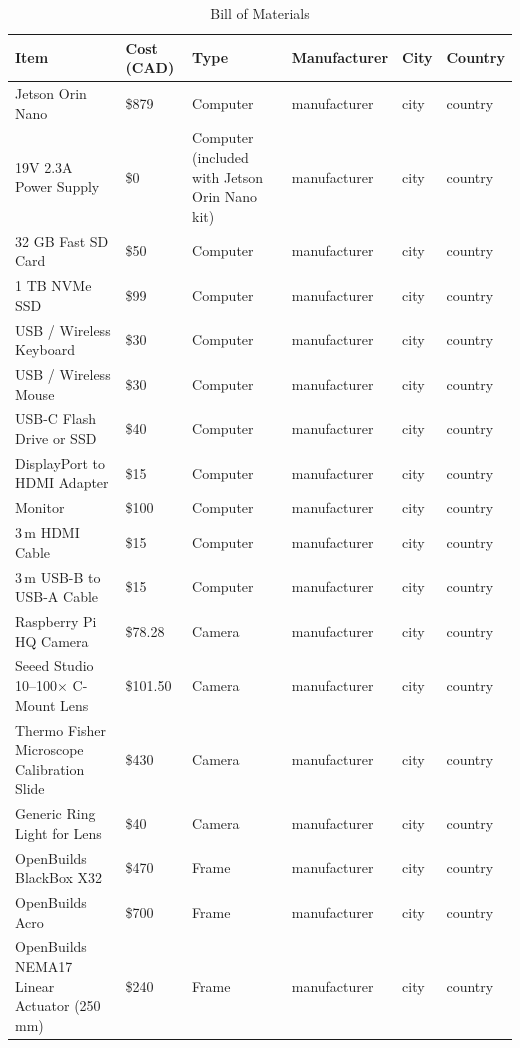 \begin{table}[p]
\centering
\caption{Bill of Materials}
\label{tab:bom}

\begin{tabular}{ |p{4cm}||p{2cm}|p{2cm}|p{2.5cm}|p{2.5cm}|p{2.5cm}|}
\hline
\textbf{Item} &
\textbf{Cost (CAD)} &
\textbf{Type} &
\textbf{Manufacturer} &
\textbf{City} &
\textbf{Country} \\
\hline

Jetson Orin Nano & \$879 & Computer & manufacturer & city & country \\
19V 2.3A Power Supply & \$0 & Computer (included with Jetson Orin Nano kit) & manufacturer & city & country \\
32 GB Fast SD Card & \$50 & Computer & manufacturer & city & country \\
1 TB NVMe SSD & \$99 & Computer & manufacturer & city & country \\
USB / Wireless Keyboard & \$30 & Computer & manufacturer & city & country \\
USB / Wireless Mouse & \$30 & Computer & manufacturer & city & country \\
USB-C Flash Drive or SSD & \$40 & Computer & manufacturer & city & country \\
DisplayPort to HDMI Adapter & \$15 & Computer & manufacturer & city & country \\
Monitor & \$100 & Computer & manufacturer & city & country \\
3\,m HDMI Cable & \$15 & Computer & manufacturer & city & country \\
3\,m USB-B to USB-A Cable & \$15 & Computer & manufacturer & city & country \\
Raspberry Pi HQ Camera & \$78.28 & Camera & manufacturer & city & country \\
Seeed Studio 10--100$\times$ C-Mount Lens & \$101.50 & Camera & manufacturer & city & country \\
Thermo Fisher Microscope Calibration Slide & \$430 & Camera & manufacturer & city & country \\
Generic Ring Light for Lens & \$40 & Camera & manufacturer & city & country \\
OpenBuilds BlackBox X32 & \$470 & Frame & manufacturer & city & country \\
OpenBuilds Acro & \$700 & Frame & manufacturer & city & country \\
OpenBuilds NEMA17 Linear Actuator (250 mm) & \$240 & Frame & manufacturer & city & country \\

\end{tabular}
\end{table}
